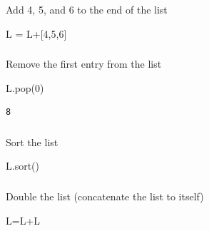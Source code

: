 \documentclass[
  letterpaper,
  DIV=11,
  numbers=noendperiod]{scrreprt}
\newenvironment{Shaded}{\begin{snugshade}}{\end{snugshade}}
\newcommand{\DecValTok}[1]{\textcolor[rgb]{0.68,0.00,0.00}{#1}}
\newcommand{\NormalTok}[1]{\textcolor[rgb]{0.00,0.23,0.31}{#1}}
\newcommand{\OperatorTok}[1]{\textcolor[rgb]{0.37,0.37,0.37}{#1}}
\begin{document}
Add 4, 5, and 6 to the end of the list

\begin{Shaded}
\begin{Highlighting}[]
\NormalTok{L }\OperatorTok{=}\NormalTok{ L}\OperatorTok{+}\NormalTok{[}\DecValTok{4}\NormalTok{,}\DecValTok{5}\NormalTok{,}\DecValTok{6}\NormalTok{]}
\end{Highlighting}
\end{Shaded}

\hypertarget{section-6}{%
\subsubsection{}\label{section-6}}

Remove the first entry from the list

\begin{Shaded}
\begin{Highlighting}[]
\NormalTok{L.pop(}\DecValTok{0}\NormalTok{)}
\end{Highlighting}
\end{Shaded}

\begin{verbatim}
8
\end{verbatim}

\hypertarget{section-7}{%
\subsubsection{}\label{section-7}}

Sort the list

\begin{Shaded}
\begin{Highlighting}[]
\NormalTok{L.sort()}
\end{Highlighting}
\end{Shaded}

\hypertarget{section-8}{%
\subsubsection{}\label{section-8}}

Double the list (concatenate the list to itself)

\begin{Shaded}
\begin{Highlighting}[]
\NormalTok{L}\OperatorTok{=}\NormalTok{L}\OperatorTok{+}\NormalTok{L}
\end{Highlighting}
\end{Shaded}
\end{document}
